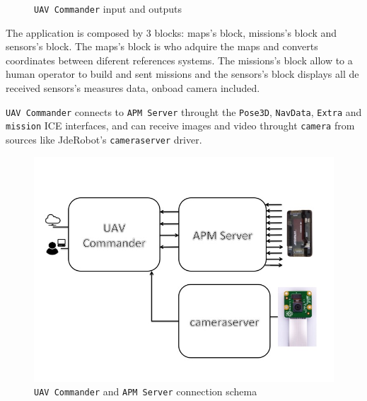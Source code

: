 \documentclass{llncs}
\begin{document}
\begin{figure}
    \caption{\texttt{UAV Commander} input and outputs}

\end{figure}



The application is composed by 3 blocks: maps's block, missions's block and sensors's block. The maps's block is who adquire the maps and converts coordinates between diferent references systems. The missions's block allow to a human operator to build and sent missions and the sensors's block displays all de received sensors's measures data, onboad camera included.

\texttt{UAV Commander} connects to \texttt{APM Server} throught the  \texttt{Pose3D}, \texttt{NavData}, \texttt{Extra} and \texttt{mission} ICE interfaces, and can receive images and video throught \texttt{camera} from sources like JdeRobot's \texttt{cameraserver} driver.

\begin{figure}[h]
  \centering
  \includegraphics[scale=0.5]{img/arquitectura.jpg}
  \caption{\texttt{UAV Commander} and \texttt{APM Server} connection schema}
  \label{fig:uavc_ppal}
\end{figure}
\end{document}

